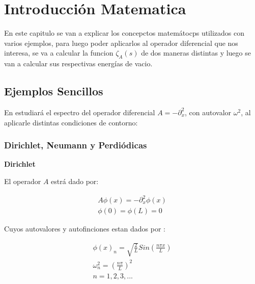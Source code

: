 \chapter{Introducción Matematica}

    
    En este capitulo se van a explicar los concepctos matemátocps utilizados con varios ejemplos, para luego poder aplicarlos al operador diferencial que nos interesa, se va a calcular la funcion $ \zeta _A (s) $ de dos maneras distintas y luego se van a calcular sus respectivas energías de vacio.

\section{Ejemplos Sencillos}

En estudiará el espectro del operador diferencial $A = - \partial ^2 _x$, con autovalor $\omega ^2$, al aplicarle distintas condiciones de contorno:

\subsection{Dirichlet, Neumann y Perdiódicas}

\textbf{Dirichlet}

El operador $A$ estrá dado por:

\begin{equation}
\begin{array}{c}
	A \phi (x) = - \partial _x ^2 \phi (x) \\
    \phi (0) = \phi(L) = 0 
\end{array}
\end{equation}



Cuyos autovalores y autofinciones estan dados por  : 

\begin{equation}
\begin{array}{c}
	\phi (x) _n = \sqrt{\frac{2}{L}} Sin( \frac{n \pi x}{L} ) \\
	\omega _n ^2 = \left( \frac{n \pi }{L} \right) ^2 \\
	n = 1,2,3, ...
\end{array}
\end{equation}

